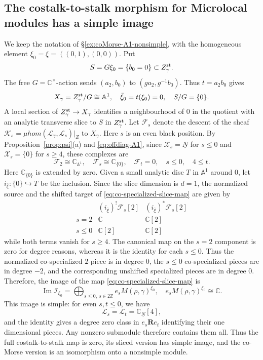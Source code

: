 \documentclass[11pt,reqno]{amsart}
\theoremstyle{definition}
\theoremstyle{remark}
\def\bbC{\mathbb C}
\def\bbZ{\mathbb Z}
\def\dN{\underline N}
\def\scrX{\mathscr X}
\def\muhom{\mu hom}
\def\bR{\mathbf R}
\begin{document}
\subsection{The costalk-to-stalk morphism for Microlocal modules has a simple image}
\label{subsubsec:A1-slice-image}
We keep the notation of \S\ref{ex:coMorse-A1-nonsimple},
with the homogeneous element $\xi_0=\xi=((0,1),(0,0))$.
Put  
$$S=G\xi_0=\{b_0=0\}\subset Z_\gamma^{\rm st}.$$
The free $G=\bbC^\times$-action sends $(a_2,b_0)$ to
$(ga_2,g^{-1}b_0)$. Thus $t=a_2b_0$ gives
\[
 X_\gamma=Z_\gamma^{\rm st}/G\cong\mathbb A^1,\quad
 \bar\xi_0=t(\xi_0)=0,\quad S/G=\{0\}.
\]
A local section of $Z_\gamma^{\rm st}\to X_\gamma$ identifies a neighbourhood
of $0$ in the quotient with an analytic transverse slice to
$S$ in $Z_\gamma^{\rm st}$.
Let $\mathcal F_s$ denote the descent of the sheaf
$\mathcal K_s=\muhom(\mathscr L_\gamma,\mathscr L_s)|_Z$ to $X_\gamma$.
Here $s$ is an even black position.  By Proposition~\ref{prop:psi}(a) and
\eqref{eq:offdiag-A1}, since $\scrX_s=\dN$ for $s\leqslant 0$ and $\scrX_s=\{0\}$ for
$s\geqslant 4$, these complexes are
\[
 \mathcal F_2\cong\bbC_{\mathbb A^1},\quad
 \mathcal F_s\cong\bbC_{\{0\}},\quad
 \mathcal F_t=0,\quad s\leqslant 0,\quad 
 4\leqslant t.
\]
Here $\bbC_{\{0\}}$ is extended by zero.
Given a small analytic
disc $T$ in $\mathbb A^1$ around $0$, let
$i_{\bar\xi}:\{0\}\hookrightarrow T$ be the inclusion. Since the slice dimension
is $d=1$, the normalized source and the shifted target of
\eqref{eq:co-specialized-slice-map} are given by
\[
 \begin{array}{c|cc}
 &(i_{\bar\xi})^!\mathcal F_s[2]&(i_{\bar\xi})^*\mathcal F_s[2]\\ \hline
 s=2 &\bbC&\bbC[2]\\
 s\leqslant0 &\bbC[2]&\bbC[2]
 \end{array}
\]
while both terms vanish for $s\geqslant4$. The canonical map on
the $s=2$ component is zero for degree reasons, whereas it is
the identity for each $s\leqslant0$. Thus the normalized
co-specialized $2$-piece is in degree $0$, the $s\leqslant0$
co-specialized pieces are in degree $-2$, and the corresponding
unshifted specialized pieces are in degree $0$. Therefore, the image of the map \eqref{eq:co-specialized-slice-map} is
\[
 \operatorname{Im}\mathcal I_{\xi_0}
 =\bigoplus_{s\leqslant0,\ s\in2\bbZ}
 e_s M(\rho,\gamma)^{\xi_0},
 \quad e_s M(\rho,\gamma)^{\xi_0}\cong\bbC.
\]
This image is simple: for even $s,t\leqslant0$, we have
$$\mathscr L_s=\mathscr L_t=\bbC_{\dN}[4],$$and the identity gives a
degree zero class in $e_s\bR e_t$ identifying their one dimensional
pieces. Any nonzero submodule therefore contains them all.
Thus the full costalk-to-stalk map is zero, its sliced
version has simple image, and the co-Morse version is an
isomorphism onto a nonsimple module. 
\end{document}

